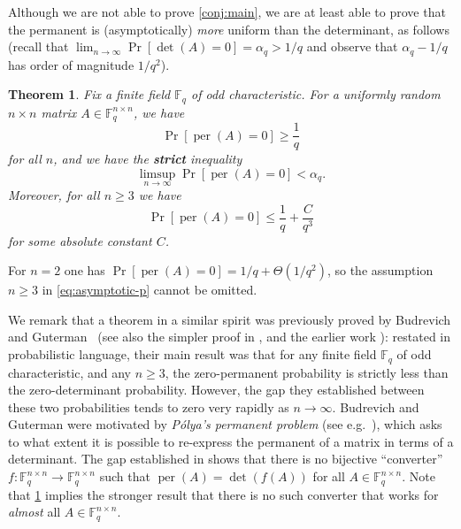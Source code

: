 \documentclass[10pt,reqno]{amsart}
\numberwithin{equation}{section}
\newtheorem{theorem}{Theorem}[section]
\theoremstyle{remark}
\newcommand{\mb}{\mathbb}
\newcommand{\on}{\operatorname}
\begin{document}
Although we are not able to prove \cref{conj:main}, we are at least
able to prove that the permanent is (asymptotically) \emph{more} uniform than the determinant,
as follows (recall that $\lim_{n\to\infty}\Pr[\det(A)=0]=\alpha_q>1/q$ and observe that $\alpha_q-1/q$ has order of magnitude $1/q^2$).
\begin{theorem}
\label{thm:main}Fix a finite field $\mathbb{F}_{q}$ of odd characteristic. For a uniformly random $n\times n$ matrix $A\in\mathbb{F}_{q}^{n\times n}$,
we have
\begin{equation}
\Pr[\on{per}(A)=0]\ge\frac{1}{q}\label{eq:trivial-lower-bound}
\end{equation}
for all $n$, and we have the \textbf{strict} inequality
\begin{equation}
\limsup_{n\to\infty}\Pr[\on{per}(A)=0]<\alpha_{q}\label{eq:separation-all-p}.
\end{equation}
Moreover, for all $n\ge 3$ we have
\begin{equation}
\Pr[\on{per}(A)=0]\le \frac{1}{q}+\frac{C}{q^{3}}\label{eq:asymptotic-p}
\end{equation}
for some absolute constant $C$. %
\end{theorem}

For $n=2$ one has $\Pr[\on{per}(A)=0]=1/q+\Theta(1/q^2)$, so the assumption $n\ge 3$ in \cref{eq:asymptotic-p} cannot be omitted.

We remark that a theorem in a similar spirit was previously proved by Budrevich and Guterman~\cite{BG12} (see also the simpler proof in \cite{Bass13}, and the earlier work \cite{DGKO11}): restated in probabilistic language, their main result was that for any finite field $\mathbb F_q$ of odd characteristic, and any $n\ge 3$, the zero-permanent probability is strictly less than the zero-determinant probability. However, the gap they established between these two probabilities tends to zero very rapidly as $n\to \infty$. Budrevich and Guterman were motivated by \emph{P\'olya's permanent problem} (see e.g.\ \cite{RST99,MM61,VY89}), which asks to what extent it is possible to re-express the permanent of a matrix in terms of a determinant. The gap established in \cite{BG12} shows that there is no bijective ``converter'' $f:\mb F_q^{n\times n}\to \mb F_q^{n\times n}$ such that $\on{per}(A)=\det(f(A))$ for all $A\in \mb F_q^{n\times n}$. Note that \cref{thm:main} implies the stronger result that there is no such converter that works for \emph{almost} all $A\in \mb F_q^{n\times n}$.
\end{document}
